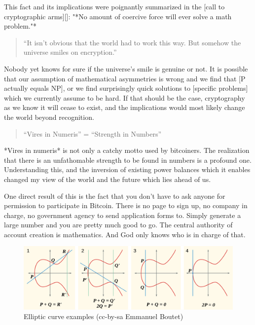 This fact and its implications were poignantly summarized in the [call
to cryptographic arms][]: "*No amount of coercive force will ever solve
a math problem."*

\begin{quotation}
``It isn't obvious that the world had to work this way. But somehow the
universe smiles on encryption.''
\end{quotation}

Nobody yet knows for sure if the universe's smile is genuine or not. It
is possible that our assumption of mathematical asymmetries is wrong and
we find that [P actually equals NP], or we find surprisingly quick
solutions to [specific problems] which we currently assume to be hard.
If that should be the case, cryptography as we know it will cease to
exist, and the implications would most likely change the world beyond
recognition.

\begin{quotation}
``Vires in Numeris'' = ``Strength in Numbers''
\end{quotation}

*Vires in numeris* is not only a catchy motto used by bitcoiners. The
realization that there is an unfathomable strength to be found in
numbers is a profound one. Understanding this, and the inversion of
existing power balances which it enables changed my view of the world
and the future which lies ahead of us.

One direct result of this is the fact that you don't have to ask anyone
for permission to participate in Bitcoin. There is no page to sign up,
no company in charge, no government agency to send application forms to.
Simply generate a large number and you are pretty much good to go. The
central authority of account creation is mathematics. And God only knows
who is in charge of that.

\begin{figure}
  \includegraphics{assets/images/elliptic-curve-examples.png}
  \caption{Elliptic curve examples (cc-by-sa Emmanuel Boutet)}
  \label{fig:elliptic-curve-examples}
\end{figure}

